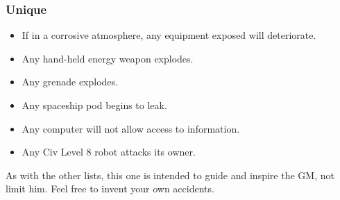 \subsubsection*{Unique}
\label{sec:unique}

\begin{itemize}
\item If in a corrosive atmosphere, any equipment exposed will
  deteriorate.
\item Any hand-held energy weapon explodes.
\item Any grenade explodes.
\item Any spaceship pod begins to leak.
\item Any computer will not allow access to information.
\item Any Civ Level 8 robot attacks its owner.
\end{itemize}

As with the other lists, this one is intended to guide and inspire the
GM, not limit him. Feel free to invent your own accidents.


